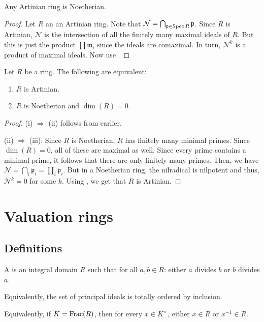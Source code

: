 \documentclass[12pt]{article}
\begin{document}
\begin{cor}
	Any Artinian ring is Noetherian.
\end{cor}
\begin{proof} 
	Let $R$ an an Artinian ring. Note that $\mathcal{N} = \bigcap_{\mathfrak{p} \in \operatorname{Spec} R} \mathfrak{p}$. Since $R$ is Artinian, $\mathcal{N}$ is the intersection of all the finitely many maximal ideals of $R$. \newline
	But this is just the product $\prod \mathfrak{m}_{i}$ since the ideals are comaximal. In turn, $\mathcal{N}^{k}$ is a product of maximal ideals. Now use .
\end{proof}

\begin{cor} \label{cor:artinian-noetherian-dimension-zero}
	Let $R$ be a ring. The following are equivalent:
	\begin{enumerate}[label=(\roman*)]
		\item $R$ is Artinian.
		\item $R$ is Noetherian and $\dim(R) = 0$.
	\end{enumerate}
\end{cor}
\begin{proof} 
	(i) $\Rightarrow$ (ii) follows from earlier.

	(ii) $\Rightarrow$ (iii): Since $R$ is Noetherian, $R$ has finitely many minimal primes. Since $\dim(R) = 0$, all of these are maximal as well. Since every prime contains a minimal prime, it follows that there are only finitely many primes. Then, we have $\mathcal{N} = \bigcap_{i} \mathfrak{p}_{i} = \prod_{i} \mathfrak{p}_{i}$. But in a Noetherian ring, the nilradical is nilpotent and thus, $\mathcal{N}^{k} = 0$ for some $k$. Using , we get that $R$ is Artinian.
\end{proof}

\section{Valuation rings}

\subsection{Definitions}

\begin{defn}
	A  is an integral domain $R$ such that for all $a, b \in R$: either $a$ divides $b$ or $b$ divides $a$.

	Equivalently, the set of principal ideals is totally ordered by inclusion.

	Equivalently, if $K = \operatorname{Frac}(R)$, then for every $x \in K^{\times}$, either $x \in R$ or $x^{-1} \in R$.
\end{defn}
\end{document}
